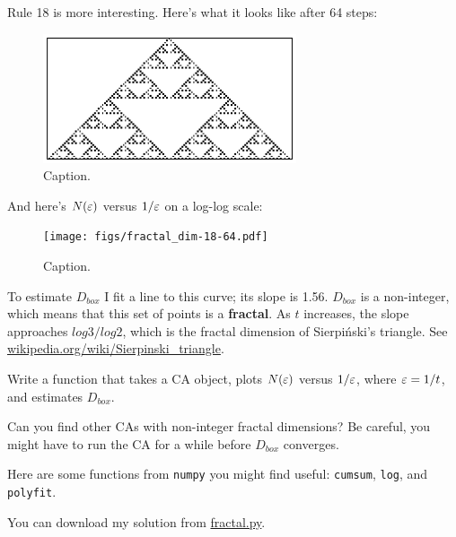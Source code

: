 \documentclass[10pt]{book}
\begin{document}
Rule 18 is more interesting.  Here's what it looks like after 64 steps:

\begin{figure}
\centerline{\includegraphics[height=1.5in]{figs/rule-18-64.pdf}}
\caption{Caption.}
\end{figure}

And here's $N(\varepsilon)$ versus $1/\varepsilon$ on a log-log scale:

\begin{figure}
\centerline{\texttt{[image: figs/fractal\_dim-18-64.pdf]}}
\caption{Caption.}
\end{figure}

To estimate $D_{box}$ I fit a line to this curve; its slope is 1.56.
$D_{box}$ is a non-integer, which means that this set of
points is a {\bf fractal}.  As $t$ increases, the slope approaches
$log 3 / log 2$, which is the fractal dimension of Sierpi\'{n}ski's
triangle.  See \url{wikipedia.org/wiki/Sierpinski_triangle}.

\begin{exercise}

Write a function that takes a CA object, plots $N(\varepsilon)$ versus
$1/\varepsilon$, where $\varepsilon = 1/t$, and estimates $D_{box}$.

Can you find other CAs with non-integer fractal dimensions?  Be
careful, you might have to run the CA for a while before
$D_{box}$ converges.

Here are some functions from {\tt numpy} you might find useful:
{\tt cumsum}, {\tt log}, and {\tt polyfit}.

You can download my solution from \url{fractal.py}.

\end{exercise}
\end{document}
